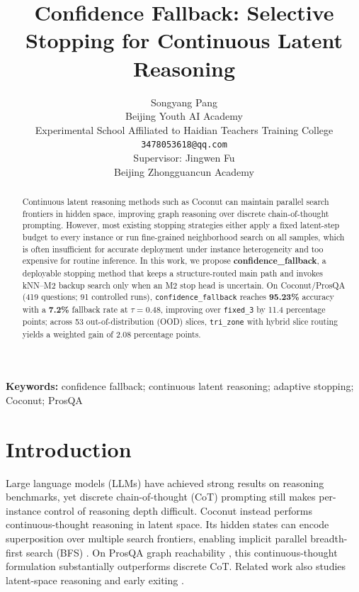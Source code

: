\documentclass{article}
\title{Confidence Fallback: Selective Stopping for Continuous Latent Reasoning}
\author{Songyang Pang \\
Beijing Youth AI Academy \\
Experimental School Affiliated to Haidian Teachers Training College \\
\texttt{3478053618@qq.com} \\
Supervisor: Jingwen Fu \\
Beijing Zhongguancun Academy
}
\begin{document}
\maketitle
\fancyhead[L]{}
\fancyhead[R]{}
\fancyhead[C]{}
\renewcommand{\headrulewidth}{0pt}

\begin{abstract}
Continuous latent reasoning methods such as Coconut can maintain parallel search frontiers in hidden space, improving graph reasoning over discrete chain-of-thought prompting. However, most existing stopping strategies either apply a fixed latent-step budget to every instance or run fine-grained neighborhood search on all samples, which is often insufficient for accurate deployment under instance heterogeneity and too expensive for routine inference. In this work, we propose \textbf{confidence\_fallback}, a deployable stopping method that keeps a structure-routed main path and invokes kNN--M2 backup search only when an M2 stop head is uncertain. On Coconut/ProsQA (419 questions; 91 controlled runs), \texttt{confidence\_fallback} reaches \textbf{95.23\%} accuracy with a \textbf{7.2\%} fallback rate at $\tau=0.48$, improving over \texttt{fixed\_3} by 11.4 percentage points; across 53 out-of-distribution (OOD) slices, \texttt{tri\_zone} with hybrid slice routing yields a weighted gain of 2.08 percentage points.
\end{abstract}

\textbf{Keywords:} confidence fallback; continuous latent reasoning; adaptive stopping; Coconut; ProsQA

\section{Introduction}

Large language models (LLMs) have achieved strong results on reasoning benchmarks, yet discrete chain-of-thought (CoT) prompting \citep{wei2022cot} still makes per-instance control of reasoning depth difficult. Coconut \citep{hao2024coconut} instead performs continuous-thought reasoning in latent space. Its hidden states can encode superposition over multiple search frontiers, enabling implicit parallel breadth-first search (BFS) \citep{zhu2025superposition}. On ProsQA graph reachability \citep{hao2024prosqa}, this continuous-thought formulation substantially outperforms discrete CoT. Related work also studies latent-space reasoning and early exiting \citep{goyal2023thoughts,pfau2024dotbydot,zhou2023earlyexit}.
\end{document}
